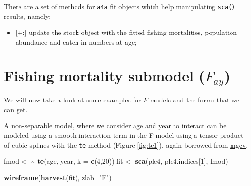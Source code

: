 \documentclass[
]{book}
\newenvironment{Shaded}{\begin{snugshade}}{\end{snugshade}}
\newcommand{\AttributeTok}[1]{\textcolor[rgb]{0.13,0.29,0.53}{#1}}
\newcommand{\DecValTok}[1]{\textcolor[rgb]{0.00,0.00,0.81}{#1}}
\newcommand{\ErrorTok}[1]{\textcolor[rgb]{0.64,0.00,0.00}{\textbf{#1}}}
\newcommand{\FunctionTok}[1]{\textcolor[rgb]{0.13,0.29,0.53}{\textbf{#1}}}
\newcommand{\NormalTok}[1]{#1}
\newcommand{\OtherTok}[1]{\textcolor[rgb]{0.56,0.35,0.01}{#1}}
\newcommand{\StringTok}[1]{\textcolor[rgb]{0.31,0.60,0.02}{#1}}
\providecommand{\tightlist}{%
  \setlength{\itemsep}{0pt}\setlength{\parskip}{0pt}}
\begin{document}
There are a set of methods for \texttt{a4a} fit objects which help manipulating \texttt{sca()} results, namely:

\begin{itemize}
\tightlist
\item
  {[}+:{]} update the stock object with the fitted fishing mortalities, population abundance and catch in numbers at age;
\end{itemize}

\hypertarget{fishing-mortality-submodel-f_ay}{%
\section{\texorpdfstring{Fishing mortality submodel (\(F_{ay}\))}{Fishing mortality submodel (F\_\{ay\})}}\label{fishing-mortality-submodel-f_ay}}

We will now take a look at some examples for \(F\) models and the forms that we can get.

A non-separable model, where we consider age and year to interact can be modeled using a smooth interaction term in the F model using a tensor product of cubic splines with the \texttt{te} method (Figure \ref{fig:te1}), again borrowed from \href{http://cran.r-project.org/web/packages/mgcv/index.html}{mgcv}.

\begin{Shaded}
\begin{Highlighting}[]
\NormalTok{fmod }\OtherTok{\textless{}{-}} \ErrorTok{\textasciitilde{}} \FunctionTok{te}\NormalTok{(age, year, }\AttributeTok{k =} \FunctionTok{c}\NormalTok{(}\DecValTok{4}\NormalTok{,}\DecValTok{20}\NormalTok{))}
\NormalTok{fit }\OtherTok{\textless{}{-}} \FunctionTok{sca}\NormalTok{(ple4, ple4.indices[}\DecValTok{1}\NormalTok{], fmod)}
\end{Highlighting}
\end{Shaded}

\begin{Shaded}
\begin{Highlighting}[]
\FunctionTok{wireframe}\NormalTok{(}\FunctionTok{harvest}\NormalTok{(fit), }\AttributeTok{zlab=}\StringTok{"F"}\NormalTok{)}
\end{Highlighting}
\end{Shaded}
\end{document}
